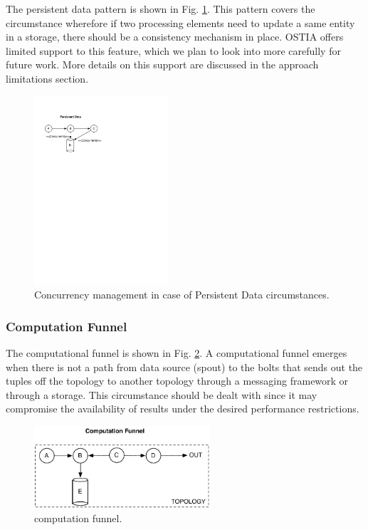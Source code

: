 The persistent data pattern is shown in Fig. \ref{fig:persistence}. This pattern covers the circumstance wherefore if two processing elements need to update a same entity in a storage, there should be a consistency mechanism in place. OSTIA offers limited support to this feature, which we plan to look into more carefully for future work. More details on this support are discussed in the approach limitations section.

\begin{figure}
	\begin{center}
		\includegraphics[width=5cm]{images/persistence}
		\caption{Concurrency management in case of Persistent Data circumstances.}
		\label{fig:persistence}
	\end{center}
\end{figure}


\subsubsection{Computation Funnel}
The computational funnel is shown in Fig. \ref{fig:funnel}. A computational funnel emerges when there is not a path from data source (spout) to the bolts that sends out the tuples off the topology to another topology through a messaging framework or through a storage. This circumstance should be dealt with since it may compromise the availability of results under the desired performance restrictions.

\begin{figure}
	\begin{center}
		\includegraphics[width=6.5cm]{images/funnel}
		\caption{computation funnel.}
		\label{fig:funnel}
	\end{center}
\end{figure}

